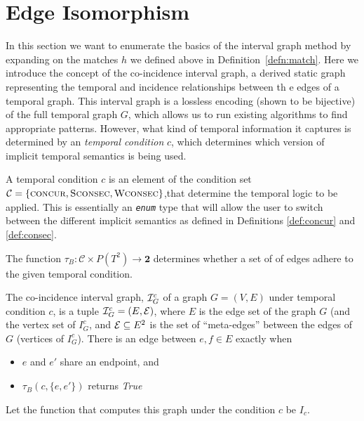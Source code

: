 \section{Edge Isomorphism}

In this section we want to enumerate the basics of the interval graph method by
expanding on the matches $h$ we defined above in
Definition~\ref{defn:match}. Here we introduce the concept of the co-incidence
interval graph, a derived static graph representing the temporal and incidence
relationships between th e edges of a temporal graph. This interval graph is a
lossless encoding (shown to be bijective) of the full temporal graph $G$, which
allows us to run existing algorithms to find appropriate patterns. However, what
kind of temporal information it captures is determined by an \textit{temporal
  condition} $c$, which determines which version of implicit temporal semantics
is being used.

\begin{defn}
  A temporal condition $c$ is an element of the condition set $\mathcal{C} =
  \{\textsc{concur}, \textsc{Sconsec}, \textsc{Wconsec}\}$,that determine the
  temporal logic to be applied. This is essentially an \emph{\texttt{enum}} type that
  will allow the user to switch between the different implicit semantics as
  defined in Definitions \ref{def:concur} and \ref{def:consec}.
\end{defn}

\begin{defn}
  The function $\tau_B : \mathcal{C} \times P(T^2) \to \textbf{2}$ determines
  whether a set of of edges adhere to the given temporal condition.
\end{defn}

\begin{defn}
  \label{def:ci_graph}
  The co-incidence interval graph, $\mathcal{I}_G^c$ of a graph $G = (V,E)$ under
  temporal condition $c$, is a tuple $\mathcal{I}_G^c = (E, \mathcal{E})$, where $E$ is the edge
  set of the graph $G$ (and the vertex set of $I_G^c$, and $\mathcal{E} \subseteq E^2$ is
  the set of ``meta-edges'' between the edges of $G$ (vertices of
  $I_G^c$). There is an edge between $e,f \in E$ exactly when
  \begin{itemize}
    \item $e$ and $e'$ share an endpoint, and
    \item $\tau_B(c,\{e,e'\})$ returns \emph{True}
  \end{itemize}

  Let the function that computes this graph under the condition $c$ be $I_c$.
\end{defn}

